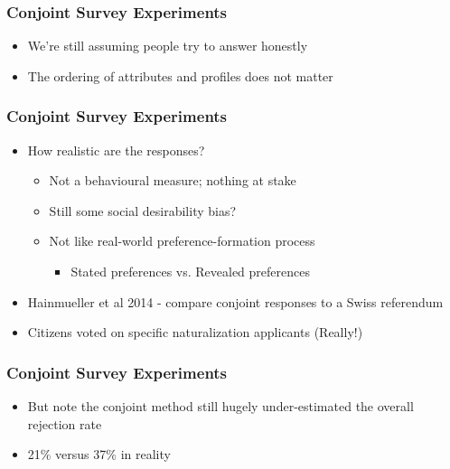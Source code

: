 \documentclass[xcolor=x11names,compress]{beamer}\usepackage[]{graphicx}\usepackage[]{color}
\renewcommand{\(}{\begin{columns}}
\renewcommand{\)}{\end{columns}}
\newcommand{\<}[1]{\begin{column}{#1}}
\renewcommand{\>}{\end{column}}
\begin{document}
\begin{frame}
\frametitle{Conjoint Survey Experiments}
\begin{itemize}
\item We're still assuming people try to answer honestly
\pause
\item The ordering of attributes and profiles does not matter
\end{itemize}
\end{frame}

\begin{frame}
\frametitle{Conjoint Survey Experiments}
\begin{itemize}
\item How realistic are the responses?
\pause
\begin{itemize}
\item Not a behavioural measure; nothing at stake
\pause
\item Still some social desirability bias?
\pause
\item Not like real-world preference-formation process
\begin{itemize}
\item Stated preferences vs. Revealed preferences
\end{itemize}
\end{itemize}
\pause
\item Hainmueller et al 2014 - compare conjoint responses to a Swiss referendum
\pause
\item Citizens voted on specific naturalization applicants (Really!)
\end{itemize}
\end{frame}



\begin{frame}
\frametitle{Conjoint Survey Experiments}
\begin{itemize}
\item But note the conjoint method still hugely under-estimated the overall rejection rate
\item 21\% versus 37\% in reality
\end{itemize}
\end{frame}
\end{document}
